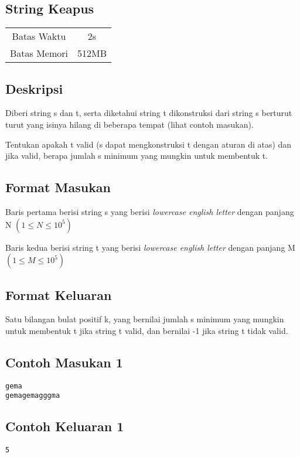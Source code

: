 \documentclass{article}
\begin{document}
\begin{center}

    
    \section*{String Keapus} %

    \begin{tabular}{ | c c | }
        \hline
        Batas Waktu  & 2s \\    %
        Batas Memori & 512MB \\  %
        \hline
    \end{tabular}
\end{center}

\subsection*{Deskripsi}

Diberi string s dan t, serta diketahui string t dikonstruksi dari string s berturut turut yang isinya hilang di beberapa tempat (lihat contoh masukan).

Tentukan apakah t valid (s dapat mengkonstruksi t dengan aturan di atas) dan jika valid, berapa jumlah s minimum yang mungkin untuk membentuk t.
\

\subsection*{Format Masukan}
Baris pertama berisi string s yang berisi \textit{lowercase english letter} dengan panjang N $(1 \leq N \leq 10^{5})$

Baris kedua berisi string t yang berisi \textit{lowercase english letter} dengan panjang M $(1 \leq M \leq 10^{5})$


\subsection*{Format Keluaran}

Satu bilangan bulat positif k, yang bernilai jumlah s minimum yang mungkin untuk membentuk t jika string t valid, dan bernilai -1 jika string t tidak valid.

\begin{multicols}{2}
\subsection*{Contoh Masukan 1}
\begin{lstlisting}
gema
gemagemagggma
\end{lstlisting}
\columnbreak
\subsection*{Contoh Keluaran 1}
\begin{lstlisting}
5
\end{lstlisting}
\vfill
\null
\end{multicols}
\end{document}
